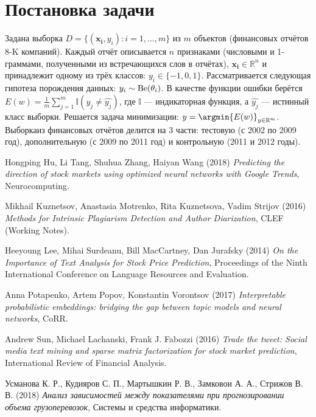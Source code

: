 \documentclass[12pt, twoside]{article}
\newcommand{\vect}[1]{\boldsymbol{#1}}
\begin{document}
\section{Постановка задачи}

Задана выборка $D = \{(\vect{x_i}, y_i): i = 1, \dots, m\}$ из $m$ объектов (финансовых отчётов 8-K компаний). Каждый отчёт описывается $n$ признаками (числовыми и 1-граммами, полученными из встречающихся слов в отчётах), $\vect{x_i} \in \mathbb{R}^n$ и принадлежит одному из трёх классов: $y_i \in \{-1, 0, 1\}$. Рассматривается следующая гипотеза порождения данных: $y_i \sim {\rm Be}(\theta_i)$. В качестве функции ошибки берётся $E(w) = \frac{1}{m} \sum_{j = 1}^{m} \mathbb{I}(y_j \neq \hat{y_j})$, где $\mathbb{I}$ --- индикаторная функция, а $\hat{y_j}$ --- истинный класс выборки. Решается задача минимизации: $y = \argmin{E(w)}_{y \in \mathbb{R}^m}$. Выборкаиз финансовых отчётов делится на 3 части: тестовую (с 2002 по 2009 год), дополнительную (с 2009 по 2011 год) и контрольную (2011 и 2012 годы).

\begin{thebibliography}{9}
Hongping Hu, Li Tang, Shuhua Zhang, Haiyan Wang (2018) \emph{Predicting the direction of stock markets using optimized neural networks with Google Trends}, Neurocomputing.

Mikhail Kuznetsov, Anastasia Motrenko, Rita Kuznetsova, Vadim Strijov (2016) \emph{Methods for Intrinsic Plagiarism Detection and Author Diarization}, CLEF (Working Notes).

Heeyoung Lee, Mihai Surdeanu, Bill MacCartney, Dan Jurafsky (2014) \emph{On the Importance of Text Analysis for Stock Price Prediction}, Proceedings of the Ninth International Conference on Language Resources and Evaluation.

Anna Potapenko, Artem Popov, Konstantin Vorontsov (2017) \emph{Interpretable probabilistic embeddings: bridging the gap between topic models and neural networks}, CoRR.

Andrew Sun, Michael Lachanski, Frank J. Fabozzi (2016) \emph{Trade the tweet: Social media text mining and sparse matrix factorization for stock market prediction}, International Review of Financial Analysis.

Усманова К. Р., Кудияров С. П., Мартышкин Р. В., Замковои А. А., Стрижов В. В. (2018) \emph{Анализ зависимостей между показателями при прогнозировании объема грузоперевозок}, Системы и средства информатики.
\end{thebibliography}
\end{document}
